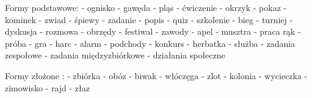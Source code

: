 Formy podstawowe:
-  ognisko	-  gawęda	- pląs 		- ćwiczenie
- okrzyk 	-  pokaz		- kominek	- zwiad
-  śpiewy	-  zadanie	- popis		- quiz
-  szkolenie	-  bieg		- turniej		- dyskusja
- rozmowa	-  obrzędy	- festiwal	- zawody
-  apel		-  musztra	- praca rąk	- próba
- gra		- harc		- alarm		-  podchody
- konkurs	- herbatka	- służba
- zadania zespołowe		- zadania międzyzbiórkowe
- działania społeczne			

Formy złożone :
-  zbiórka	-  obóz		-  biwak		-  włóczęga
-  zlot		-  kolonia	-  wycieczka	-  zimowisko
-  rajd		-  złaz
